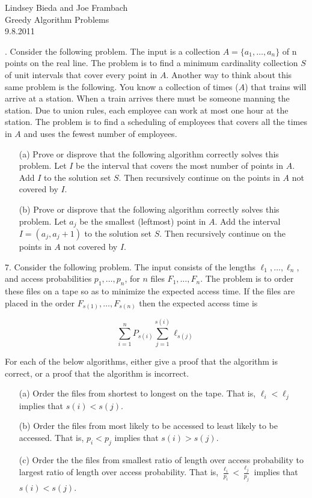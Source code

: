 \documentclass[10pt]{article}
\begin{document}
	\begin{flushright}
	Lindsey Bieda and Joe Frambach\\
	Greedy Algorithm Problems\\
	9.8.2011
	\end{flushright}
	.  Consider the following problem. The input is a collection $A = \{a_{1}, \ldots , a_{n} \}$ of n points on the real line.
	The problem is to find a minimum cardinality collection $S$ of unit intervals that cover every point in
	$A$. Another way to think about this same problem is the following. You know a collection of times ($A$)
	that trains will arrive at a station. When a train arrives there must be someone manning the station.
	Due to union rules, each employee can work at most one hour at the station. The problem is to find a
	scheduling of employees that covers all the times in $A$ and uses the fewest number of employees.
	\begin{enumerate}
		\item[(a)] Prove or disprove that the following algorithm correctly solves this problem. Let $I$ be the interval
		that covers the most number of points in $A$. Add $I$ to the solution set $S$. Then recursively continue on the points in 
		$A$ not covered by $I$.
		\item[(b)] Prove or disprove that the following algorithm correctly solves this problem. Let $a_{j}$ be the smallest
		(leftmost) point in $A$.  Add the interval $I = (a_{j} , a_{j} + 1)$ to the solution set $S$.  Then recursively
		continue on the points in $A$ not covered by $I$.
	\end{enumerate}
	7. Consider the following problem.  The input consists of the lengths $\ell_{1}, \ldots , \ell_{n}$, and access probabilities
		$p_{1} , \ldots , p_{n}$, for $n$ files $F_{1} , \ldots , F_{n}$.  The problem is to order these files on a tape so as to minimize the
		expected access time. If the files are placed in the order $F_{s(1)} , \ldots , F_{s(n)}$ then the expected access time
		is
		
	\[\sum\limits_{i=1}^n P_{s(i)} \sum\limits_{j=1}^{s(i)} \ell_{s(j)}\]
	
	For each of the below algorithms, either give a proof that the algorithm is correct, or a proof that the
	algorithm is incorrect.
	\begin{enumerate}
		\item[(a)] Order the files from shortest to longest on the tape. That is, $\ell_{i} < \ell_{j}$ implies that $s(i) < s(j)$.
		\item[(b)] Order the files from most likely to be accessed to least likely to be accessed.  That is, $p_{i} < p_{j}$
		implies that $s(i) > s(j)$.
		\item[(c)] Order the the files from smallest ratio of length over access probability to largest ratio of length
		over access probability. That is, $\frac{\ell_{i}}{p_{i}} < \frac{\ell_{j}}{p_{j}}$ implies that $s(i) < s(j)$.
	\end{enumerate}
\end{document}
